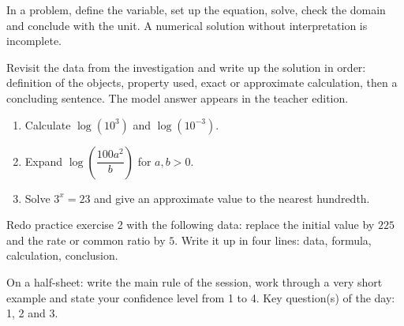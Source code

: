 \begin{traceecrite}In a problem, define the variable, set up the equation, solve, check the domain and conclude with the unit. A numerical solution without interpretation is incomplete.\end{traceecrite}

\begin{exemple}
Revisit the data from the investigation and write up the solution in order: definition of the objects, property used, exact or approximate calculation, then a concluding sentence. The model answer appears in the teacher edition.
\end{exemple}

\begin{exercice}[-- essential]
\begin{enumerate}\item Calculate $\log(10^3)$ and $\log(10^{-3})$.\item Expand $\log\!\left(\dfrac{100a^2}{b}\right)$ for $a,b>0$.\item Solve $3^x=23$ and give an approximate value to the nearest hundredth.\end{enumerate}
\end{exercice}


\begin{dm}Redo practice exercise 2 with the following data: replace the initial value by $225$ and the rate or common ratio by $5$. Write it up in four lines: data, formula, calculation, conclusion.\end{dm}

\begin{sortie}On a half-sheet: write the main rule of the session, work through a very short example and state your confidence level from 1 to 4. Key question(s) of the day: 1, 2 and 3.\end{sortie}


